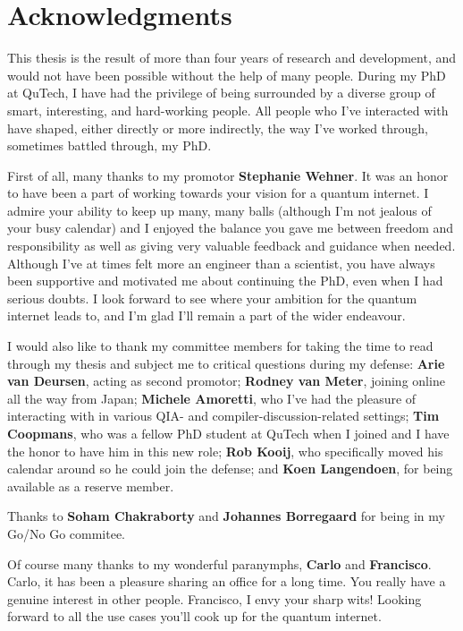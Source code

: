 \chapter*{Acknowledgments}

This thesis is the result of more than four years of research and development, and would not have been possible without the help of many people.
During my PhD at QuTech, I have had the privilege of being surrounded by a diverse group of smart, interesting, and hard-working people.
All people who I've interacted with have shaped, either directly or more indirectly, the way I've worked through, sometimes battled through, my PhD.

First of all, many thanks to my promotor \textbf{Stephanie Wehner}.
It was an honor to have been a part of working towards your vision for a quantum internet.
I admire your ability to keep up many, many balls (although I'm not jealous of your busy calendar)
and I enjoyed the balance you gave me between freedom and responsibility as well as giving very valuable feedback and guidance when needed.
Although I've at times felt more an engineer than a scientist, you have always been supportive and motivated me about continuing the PhD, even when I had serious doubts.
I look forward to see where your ambition for the quantum internet leads to, and I'm glad I'll remain a part of the wider endeavour.

I would also like to thank my committee members for taking the time to read through my thesis and subject me to critical questions during my defense:
\textbf{Arie van Deursen}, acting as second promotor;
\textbf{Rodney van Meter}, joining online all the way from Japan;
\textbf{Michele Amoretti}, who I've had the pleasure of interacting with in various QIA- and compiler-discussion-related settings;
\textbf{Tim Coopmans}, who was a fellow PhD student at QuTech when I joined and I have the honor to have him in this new role;
\textbf{Rob Kooij}, who specifically moved his calendar around so he could join the defense;
and \textbf{Koen Langendoen}, for being available as a reserve member.

Thanks to \textbf{Soham Chakraborty} and \textbf{Johannes Borregaard} for being in my Go/No Go commitee.

Of course many thanks to my wonderful paranymphs, \textbf{Carlo} and \textbf{Francisco}.
Carlo, it has been a pleasure sharing an office for a long time. You really have a genuine interest in other people.
Francisco, I envy your sharp wits! Looking forward to all the use cases you'll cook up for the quantum internet.


